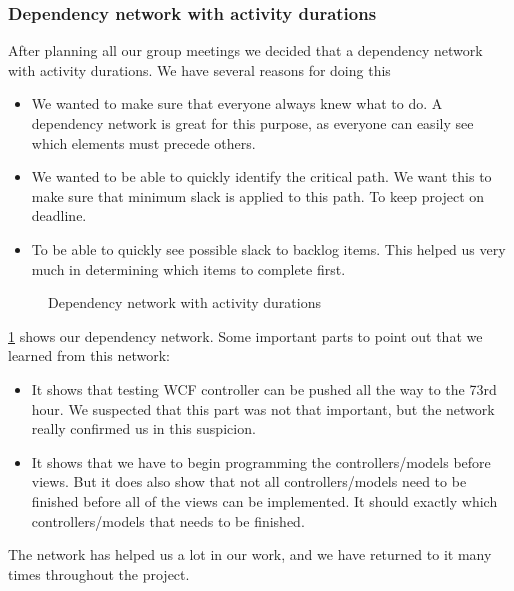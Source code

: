 \subsubsection{Dependency network with activity durations}
After planning all our group meetings we decided that a dependency network with activity durations. We have several reasons for doing this
\begin{itemize}
	\item We wanted to make sure that everyone always knew what to do. A dependency network is great for this purpose, as everyone can easily see which elements must precede others.
	\item We wanted to be able to quickly identify the critical path. We want this to make sure that minimum slack is applied to this path. To keep project on deadline.
	\item To be able to quickly see possible slack to backlog items. This helped us very much in determining which items to complete first.
\end{itemize}

\begin{figure}[H]
  \caption{Dependency network with activity durations}
  \label{dependency network}
\end{figure}

\cref{dependency network} shows our dependency network.
Some important parts to point out that we learned from this network:
\begin{itemize}
	\item It shows that testing WCF controller can be pushed all the way to the 73rd hour. We suspected that this part was not that important, but the network really confirmed us in this suspicion.
	\item It shows that we have to begin programming the controllers/models before views. But it does also show that not all controllers/models need to be finished before all of the views can be implemented. It should exactly which controllers/models that needs to be finished.
\end{itemize}

The network has helped us a lot in our work, and we have returned to it many times throughout the project.